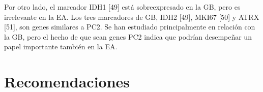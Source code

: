 Por otro lado, el marcador IDH1 [49] está sobreexpresado en la GB, pero es irrelevante en la EA. Los tres marcadores de GB, IDH2 [49], MKI67 [50] y ATRX [51], son genes similares a PC2. Se han estudiado principalmente en relación con la GB, pero el hecho de que sean genes PC2 indica que podrían desempeñar un papel importante también en la EA.

\chapter*{Recomendaciones}\label{recomendations}

\lipsum[14-15]